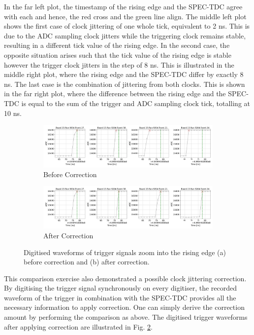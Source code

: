 In the far left plot, the timestamp of the rising edge and the SPEC-TDC agree with each and hence, the red cross and the green line align.
The middle left plot shows the first case of clock jittering of one whole tick, equivalent to 2 ns.
This is due to the ADC sampling clock jitters while the triggering clock remains stable, resulting in a different tick value of the rising edge.
In the second case, the opposite situation arises such that the tick value of the rising edge is stable however the trigger clock jitters in the step of 8 ns.
This is illustrated in the middle right plot, where the rising edge and the SPEC-TDC differ by exactly 8 ns. 
The last case is the combination of jittering from both clocks.
This is shown in the far right plot, where the difference between the rising edge and the SPEC-TDC is equal to the sum of the trigger and ADC sampling clock tick, totalling at 10 ns.

\begin{figure}[t!]
\begin{subfigure}[h]{1.00\linewidth}
\centering    
\includegraphics[width=\linewidth]{jitter_before}
\caption{Before Correction}
\label{subfig:jitter_before}
\end{subfigure}
\vspace{0.5cm}
\begin{subfigure}[h]{1.00\linewidth}
\centering    
\includegraphics[width=\linewidth]{jitter_after}
\caption{After Correction}
\label{subfig:jitter_after}
\end{subfigure}%

\caption[Clock Jitterin Cases]{
Digitised waveforms of trigger signals zoom into the rising edge (a) before correction and (b) after correction.
}
\label{fig:jitterCorr}
\end{figure}

This comparison exercise also demonstrated a possible clock jittering correction.
By digitising the trigger signal synchronously on every digitiser, the recorded waveform of the trigger in combination with the SPEC-TDC provides all the necessary information to apply correction.
One can simply derive the correction amount by performing the comparison as above.
The digitised trigger waveforms after applying correction are illustrated in Fig. \ref{subfig:jitter_after}.

